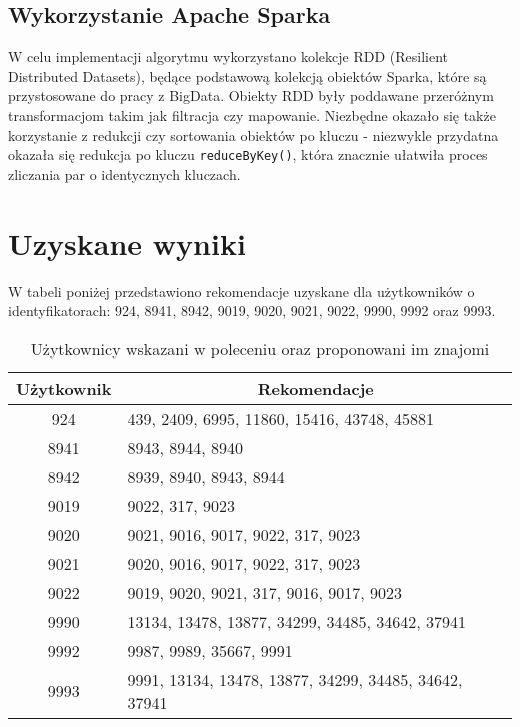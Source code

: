 \documentclass[a4paper,11pt]{article}
\begin{document}
\subsection{Wykorzystanie Apache Sparka}

W celu implementacji algorytmu wykorzystano kolekcje RDD (Resilient Distributed Datasets), będące podstawową kolekcją obiektów Sparka, które są przystosowane do pracy z BigData. Obiekty RDD były poddawane przeróżnym transformacjom takim jak filtracja czy mapowanie. Niezbędne okazało się także korzystanie z redukcji czy sortowania obiektów po kluczu - niezwykle przydatna okazała się redukcja po kluczu \verb|reduceByKey()|, która znacznie ułatwiła proces zliczania par o identycznych kluczach. 

\newpage

\section{Uzyskane wyniki}

W tabeli poniżej przedstawiono rekomendacje uzyskane dla użytkowników o identyfikatorach: 924, 8941, 8942, 9019, 9020, 9021, 9022, 9990, 9992 oraz 9993.

\begin{table}[H]
\centering
\caption{Użytkownicy wskazani w poleceniu oraz proponowani im znajomi}
\begin{tabular}{|c|l|}
\hline
Użytkownik & \multicolumn{1}{c|}{Rekomendacje} \\ \hline
924 & 439, 2409, 6995, 11860, 15416, 43748, 45881 \\ \hline
8941 & 8943, 8944, 8940 \\ \hline
8942 & 8939, 8940, 8943, 8944 \\ \hline
9019 & 9022, 317, 9023 \\ \hline
9020 & 9021, 9016, 9017, 9022, 317, 9023 \\ \hline
9021 & 9020, 9016, 9017, 9022, 317, 9023 \\ \hline
9022 & 9019, 9020, 9021, 317, 9016, 9017, 9023 \\ \hline
9990 & 13134, 13478, 13877, 34299, 34485, 34642, 37941 \\ \hline
9992 & 9987, 9989, 35667, 9991 \\ \hline
9993 & 9991, 13134, 13478, 13877, 34299, 34485, 34642, 37941 \\ \hline
\end{tabular}
\end{table}
\end{document}
